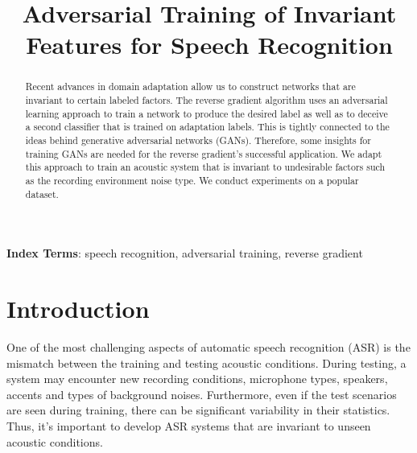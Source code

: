 \documentclass[a4paper]{article}
\title{Adversarial Training of Invariant Features for Speech Recognition}
\begin{document}
\maketitle
% 
\begin{abstract}
Recent advances in domain adaptation allow us to construct networks that are
invariant to certain labeled factors. The reverse gradient algorithm uses an
adversarial learning approach to train a network to produce the desired label
as well as to deceive a second classifier that is trained on adaptation 
labels. This is tightly connected to the ideas behind generative adversarial 
networks (GANs). Therefore, some insights for training GANs are needed for the
reverse gradient's successful application. We adapt this approach to train an 
acoustic system that is invariant to undesirable factors such as the recording
environment noise type. We conduct experiments on a popular dataset.
\end{abstract}
\noindent\textbf{Index Terms}: speech recognition, adversarial training, 
reverse gradient
\section{Introduction}
\label{sec:intro}
    One of the most challenging aspects of automatic speech recognition (ASR)
    is the mismatch between the training and testing acoustic conditions. 
    During testing, a system may encounter new recording conditions, 
    microphone types, speakers, accents and types of background noises. 
    Furthermore, even if the test scenarios are seen during training, there 
    can be significant variability in their statistics. Thus, it's important to 
    develop ASR systems that are invariant to unseen acoustic conditions.
\end{document}
